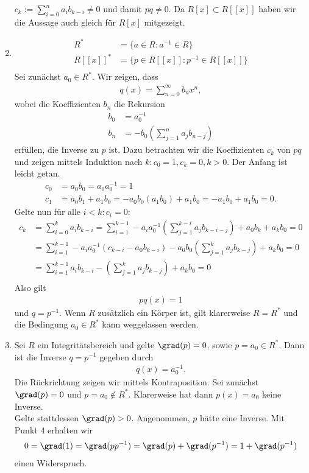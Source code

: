 \begin{solution}
\begin{enumerate}
  $c_k := \sum_{i=0}^n a_ib_{k-i} \neq 0$ und damit $pq \neq 0$.
  Da $R[x] \subset R[[x]]$ haben wir die Aussage auch gleich für $R[x]$
  mitgezeigt.
  \item \begin{align*}
    R^* &= \{a \in R: a^{-1} \in R\} \\
    R[[x]]^* &= \{p \in R[[x]]: p^{-1} \in R[[x]]\} \\
  \end{align*}
  Sei zunächst $a_0 \in R^*$. Wir zeigen, dass
  \begin{align*}
    q(x) = \sum_{n=0}^{\infty}b_nx^n,
  \end{align*}
  wobei die Koeffizienten $b_n$ die Rekursion
  \begin{align*}
    b_0 &= a_0^{-1} \\
    b_n &= -b_0\left(\sum_{j=1}^na_jb_{n-j}\right)
  \end{align*}
  erfüllen, die Inverse zu $p$ ist. Dazu betrachten wir die Koeffizienten $c_k$
  von $pq$ und zeigen mittels Induktion nach $k: c_0 = 1, c_k = 0, k > 0$. Der Anfang ist leicht getan.
  \begin{align*}
    c_0 &= a_0b_0 = a_0a_0^{-1} = 1 \\
    c_1 &= a_0b_1 + a_1b_0 = -a_0b_0(a_1b_0) + a_1b_0 = -a_1b_0 + a_1b_0 = 0.
  \end{align*}
  Gelte nun für alle $i < k: c_i = 0$:
  \begin{align*}
    c_k &= \sum_{i=0}^{k} a_i b_{k-i}
    = \sum_{i=1}^{k-1} -a_ia_0^{-1}\left(\sum_{j=1}^{k-i}a_jb_{k-i-j}\right) + a_0b_k + a_kb_0 = 0 \\
    &= \sum_{i=1}^{k-1} -a_ia_0^{-1}\left(c_{k-i} - a_0b_{k-i}\right) - a_0b_0\left(\sum_{j=1}^ka_jb_{k-j}\right) + a_kb_0 = 0 \\
    &= \sum_{i=1}^{k-1} a_ib_{k-i} - \left(\sum_{j=1}^ka_jb_{k-j}\right) + a_kb_0 = 0 \\
  \end{align*}
  Also gilt
  \begin{align*}
    pq(x) = 1
  \end{align*}
  und $q = p^{-1}$. Wenn $R$ zusätzlich ein Körper ist, gilt klarerweise $R = R^*$
  und die Bedingung $a_0 \in R^*$ kann weggelassen werden.
  \item Sei $R$ ein Integritätsbereich und gelte $\grad(p) = 0$, sowie $p = a_0 \in R^*$.
  Dann ist die Inverse $q = p^{-1}$ gegeben durch
  \begin{align*}
    q(x) = a_0^{-1}.
  \end{align*}
  Die Rückrichtung zeigen wir mittels Kontraposition.
  Sei zunächst $\grad(p) = 0$ und $p = a_0 \notin R^*$.
  Klarerweise hat dann $p(x) = a_0$ keine Inverse. \\
  Gelte stattdessen $\grad(p) > 0$. Angenommen, $p$ hätte eine Inverse.
  Mit Punkt 4 erhalten wir
  \begin{align*}
    0 = \grad(1) = \grad(pp^{-1}) = \grad(p) + \grad(p^{-1}) = 1 + \grad(p^{-1})
  \end{align*}
  einen Widerspruch.
\end{enumerate}
\end{solution}
